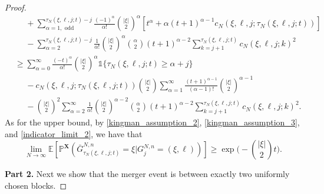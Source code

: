 \documentclass[a4paper,11pt]{article}
\theoremstyle{definition}
\newcommand{\bbP}{\mathbb{P}}
\newcommand{\bbE}{\mathbb{E}}
\newcommand{\bfX}{\mathbf{X}}
\begin{document}
\begin{proof}
\begin{align*}
&\phantom{\geq} + \sum_{ \alpha = 1, \text{ odd} }^{ \tau_N( \xi, \ell, j; t ) - j } \frac{ ( -1 )^{ \alpha } }{ \alpha ! } \binom{ | \xi | }{ 2 }^{ \alpha } [ t^{ \alpha } + \alpha ( t + 1 )^{ \alpha - 1 } c_N( \xi, \ell, j; \tau_N( \xi, \ell, j; t ) ) ] \\
&\phantom{\geq} - \sum_{ \alpha = 2 }^{ \tau_N( \xi, \ell, j; t ) - j } \frac{ 1 }{ \alpha ! } \binom{ | \xi | }{ 2 }^{ \alpha } \binom{ \alpha }{ 2 } ( t + 1 )^{ \alpha - 2 } \sum_{ k = j + 1 }^{ \tau_N( \xi, \ell, j; t ) } c_N( \xi, \ell, j; k )^2 \\
&\geq \sum_{ \alpha = 0 }^{ \infty } \frac{ ( -t )^{ \alpha } }{ \alpha ! } \binom{ | \xi | }{ 2 }^{ \alpha } \mathds{ 1 }\{ \tau_N( \xi, \ell, j; t ) \geq \alpha + j \} \\
&\phantom{\geq} - c_N( \xi, \ell, j; \tau_N( \xi, \ell, j; t ) ) \binom{ | \xi | }{ 2 } \sum_{ \alpha = 1 }^{ \infty } \frac{ ( t + 1 )^{ \alpha - 1 } }{ ( \alpha - 1 ) ! } \binom{ | \xi | }{ 2 }^{ \alpha - 1 } \\
&\phantom{\geq} - \binom{ | \xi | }{ 2 }^2 \sum_{ \alpha = 2 }^{ \infty } \frac{ 1 }{ \alpha ! } \binom{ | \xi | }{ 2 }^{ \alpha - 2 } \binom{ \alpha }{ 2 } ( t + 1 )^{ \alpha - 2 } \sum_{ k = j + 1 }^{ \tau_N( \xi, \ell, j; t ) } c_N( \xi, \ell, j; k )^2.
\end{align*}
As for the upper bound, by \eqref{kingman_assumption_2}, \eqref{kingman_assumption_3}, and \eqref{indicator_limit_2}, we have that
\begin{equation} \label{exponential_lower}
\lim_{ N \to \infty } \bbE[ \bbP^{ \bfX }(  \bar{ G }_{ \tau_N( \xi, \ell, j; t ) }^{ N, n } = \xi | G_j^{ N, n } = ( \xi, \ell ) ) ] \geq \exp\Bigg( - \binom{ | \xi | }{ 2 } t \Bigg).
\end{equation}

\textbf{Part 2.} Next we show that the merger event is between exactly two uniformly chosen blocks.


\end{proof}
\end{document}
